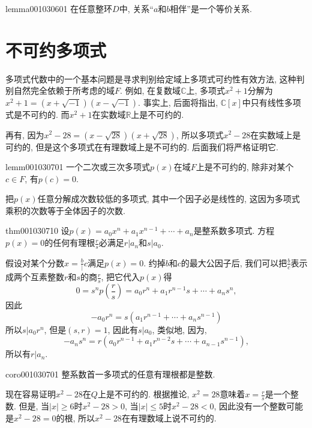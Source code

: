 \begin{lemma}{}{lemma001030601}
在任意整环$D$中, 关系“$a$和$b$相伴”是一个等价关系. 
\end{lemma}


\section{不可约多项式}\label{section0010307}
多项式代数中的一个基本问题是寻求判别给定域上多项式可约性有效方法, 这种判别自然完全依赖于所考虑的域$F$. 例如, 在复数域$\mathbb{C}$上, 多项式$x^2+1$分解为$x^2+1=(x+\sqrt{-1})(x-\sqrt{-1})$. 事实上, 后面将指出, $\mathbb{C}[x]$中只有线性多项式是不可约的. 而$x^2+1$在实数域$\mathbb{R}$上是不可约的. 

再有, 因为$x^2-28=(x-\sqrt{28})(x+\sqrt{28})$, 所以多项式$x^2-28$在实数域上是可约的, 但是这个多项式在有理数域上是不可约的. 后面我们将严格证明它. 

\begin{lemma}{}{lemm001030701}
一个二次或三次多项式$p(x)$在域$F$上是不可约的, 除非对某个$c \in F$, 有$p(c)=0$. 
\end{lemma}

把$p(x)$任意分解成次数较低的多项式, 其中一个因子必是线性的, 这因为多项式乘积的次数等于全体因子的次数. 

\begin{theorem}{}{thm001030710}
设$p(x)=a_0x^n+a_1x^{n-1}+\cdots+a_n$是整系数多项式. 方程$p(x)=0$的任何有理根$\frac{r}{s}$必满足$r|a_n$和$s|a_0$. 
\end{theorem}

假设对某个分数$x=\frac{b}|{c}$满足$p(x)=0$. 约掉$b$和$c$的最大公因子后, 我们可以把$\frac{b}{c}$表示成两个互素整数$r$和$s$的商$\frac{r}{s}$, 把它代入$p(x)$得
\begin{equation}\label{equ001030712}
0 = s^np(\frac{r}{s}) = a_0r^n + a_1r^{n-1}s+\cdots+a_ns^n,
\end{equation}
因此
\[
-a_0r^n = s(a_1r^{n-1}+\cdots+a_ns^{n-1})
\]
所以$s|a_0r^n$, 但是$(s, r)=1$, 因此有$s|a_0$, 类似地, 因为, 
\[
-a_ns^n = r(a_0r^{n-1} + a_1r^{n-2}s+\cdots+a_{n-1}s^{n-1}),
\]
所以有$r|a_n$. 

\begin{corollary}{}{coro001030701}
整系数首一多项式的任意有理根都是整数. 
\end{corollary}

现在容易证明$x^2-28$在$Q$上是不可约的. 根据推论, $x^2=28$意味着$x = \frac{r}{s}$是一个整数. 但是, 当$|x| \ge 6$时$x^2-28>0$, 当$|x| \le 5$时$x^2-28<0$, 因此没有一个整数可能是$x^2-28=0$的根, 所以$x^2-28$在有理数域上说不可约的. 

